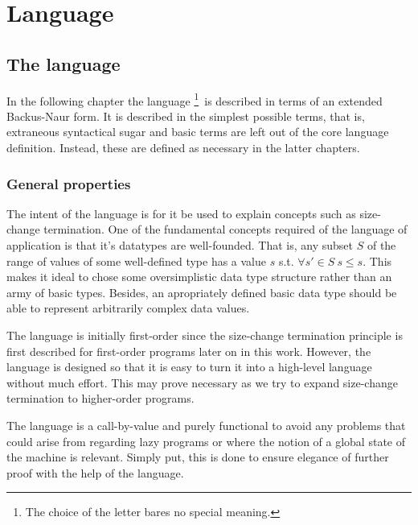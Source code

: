\chapter{Language}

\section{The language }

In the following chapter the language \footnote{The choice of the
letter  bares no special meaning.}\ is described in terms of an
extended Backus-Naur form\footnotemark. It is described in the simplest
possible terms, that is, extraneous syntactical sugar and basic terms are left
out of the core language definition.  Instead, these are defined as necessary
in the latter chapters.


\subsection{General properties}

The intent of the language is for it be used to explain concepts such as
size-change termination. One of the fundamental concepts required of the
language of application is that it's datatypes are well-founded. That is, any
subset $S$ of the range of values of some well-defined type has a value $s$
s.t. $\forall {s'\in S}\ s\leq s$. This makes it ideal to chose some
oversimplistic data type structure rather than an army of basic types. Besides,
an apropriately defined basic data type should be able to represent arbitrarily
complex data values.

The language is initially first-order since the size-change termination
principle is first described for first-order programs later on in this work.
However, the language is designed so that it is easy to turn it into a
high-level language without much effort. This may prove necessary as we try to
expand size-change termination to higher-order programs.

The language is a call-by-value and purely functional to avoid any problems
that could arise from regarding lazy programs or where the notion of a global
state of the machine is relevant. Simply put, this is done to ensure elegance
of further proof with the help of the language.



